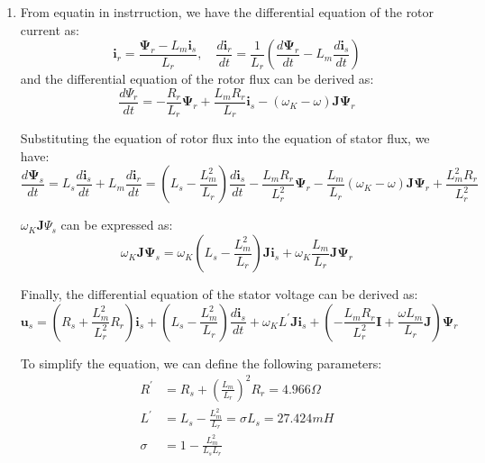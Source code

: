 \documentclass[12pt,a4paper, openany]{book}
\begin{document}
\begin{enumerate}
\item 
From equatin in instrruction, we have the differential equation of the rotor current as:
\begin{equation}
    \mathbf{i}_r=\frac{\mathbf{\Psi}_r-L_m\mathbf{i}_s}{L_r},\quad\frac{d\mathbf{i}_r}{dt}=\frac{1}{L_r}\left(\frac{d\mathbf{\Psi}_r}{dt}-L_m\frac{d\mathbf{i}_s}{dt}\right)
\end{equation}
and the differential equation of the rotor flux can be derived as:
\begin{equation}
    \frac{d\Psi_r}{dt}=-\frac{R_r}{L_r}\boldsymbol{\Psi}_r+\frac{L_mR_r}{L_r}\mathbf{i}_s-(\omega_K-\omega)\mathbf{J}\boldsymbol{\Psi}_r
\end{equation}

Substituting the equation of rotor flux into the equation of stator flux, we have:
\begin{equation}
   \frac{d\boldsymbol{\Psi}_s}{dt}=L_s\frac{d\mathbf{i}_s}{dt}+L_m\frac{d\mathbf{i}_r}{dt}=\left(L_s-\frac{L_m^2}{L_r}\right)\frac{d\mathbf{i}_s}{dt}-\frac{L_mR_r}{L_r^2}\boldsymbol{\Psi}_r-\frac{L_m}{L_r}(\omega_K-\omega)\mathbf{J}\boldsymbol{\Psi}_r+\frac{L_m^2R_r}{L_r^2}
\end{equation}

$\omega_K\mathbf{J}\Psi_s$ can be expressed as:
\begin{equation}
    \omega_K\mathbf{J}\boldsymbol{\Psi}_s=\omega_K\left(L_s-\frac{L_m^2}{L_r}\right)\mathbf{J}\mathbf{i}_s+\omega_K\frac{L_m}{L_r}\mathbf{J}\boldsymbol{\Psi}_r
\end{equation}

Finally, the differential equation of the stator voltage can be derived as:
\begin{equation}
    \mathbf{u}_s=\left(R_s+\frac{L_m^2}{L_r^2}R_r\right)\mathbf{i}_s+\left(L_s-\frac{L_m^2}{L_r}\right)\frac{d\mathbf{i}_s}{dt}+\omega_KL^{\prime}\mathbf{J}\mathbf{i}_s+\left(-\frac{L_mR_r}{L_r^2}\mathbf{I}+\frac{\omega L_m}{L_r}\mathbf{J}\right)\mathbf{\Psi}_r
\end{equation}

To simplify the equation, we can define the following parameters:
\begin{equation}
    \begin{aligned}
        R^{\prime}&=R_s+\left(\frac{L_m}{L_r}\right)^2R_r=4.966\Omega\\
        L^{\prime}&=L_s-\frac{L_m^2}{L_r}=\sigma L_s=27.424mH\\
        \sigma&=1-\frac{L_m^2}{L_sL_r}
    \end{aligned}
\end{equation}


\end{enumerate}
\end{document}
